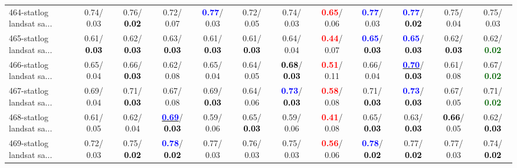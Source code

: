 \begin{table}[h]
\begin{center}
{\begin{tabular}{lc|c|c|c|c|c|c|c|c|c|c}
464-statlog landsat sa... &   0.74/  0.03 &   0.76/\textcolor{black}{\textbf{  0.02}} &   0.72/  0.07 & \textcolor{blue}{\textbf{  0.77}}/  0.03 &   0.72/  0.05 &   0.74/  0.03 & \textcolor{red}{\textbf{  0.65}}/  0.06 & \textcolor{blue}{\textbf{  0.77}}/  0.03 & \textcolor{blue}{\textbf{  0.77}}/\textcolor{black}{\textbf{  0.02}} &   0.75/  0.04 &   0.75/  0.03 \\
465-statlog landsat sa... &   0.61/\textcolor{black}{\textbf{  0.03}} &   0.62/\textcolor{black}{\textbf{  0.03}} &   0.63/\textcolor{black}{\textbf{  0.03}} &   0.61/\textcolor{black}{\textbf{  0.03}} &   0.61/\textcolor{black}{\textbf{  0.03}} &   0.64/  0.04 & \textcolor{red}{\textbf{  0.44}}/  0.07 & \textcolor{blue}{\textbf{  0.65}}/\textcolor{black}{\textbf{  0.03}} & \textcolor{blue}{\textbf{  0.65}}/\textcolor{black}{\textbf{  0.03}} &   0.62/\textcolor{black}{\textbf{  0.03}} &   0.62/\textcolor{darkgreen}{\textbf{  0.02}} \\
466-statlog landsat sa... &   0.65/  0.04 &   0.66/\textcolor{black}{\textbf{  0.03}} &   0.62/  0.08 &   0.65/  0.04 &   0.64/  0.05 & \textcolor{black}{\textbf{  0.68}}/\textcolor{black}{\textbf{  0.03}} & \textcolor{red}{\textbf{  0.51}}/  0.11 &   0.66/  0.04 & \underline{\textcolor{blue}{\textbf{  0.70}}}/\textcolor{black}{\textbf{  0.03}} &   0.61/  0.08 &   0.67/\textcolor{darkgreen}{\textbf{  0.02}} \\
467-statlog landsat sa... &   0.69/  0.04 &   0.71/\textcolor{black}{\textbf{  0.03}} &   0.67/  0.08 &   0.69/\textcolor{black}{\textbf{  0.03}} &   0.64/  0.06 & \textcolor{blue}{\textbf{  0.73}}/\textcolor{black}{\textbf{  0.03}} & \textcolor{red}{\textbf{  0.58}}/  0.08 &   0.71/\textcolor{black}{\textbf{  0.03}} & \textcolor{blue}{\textbf{  0.73}}/\textcolor{black}{\textbf{  0.03}} &   0.67/  0.05 &   0.71/\textcolor{darkgreen}{\textbf{  0.02}} \\
468-statlog landsat sa... &   0.61/  0.05 &   0.62/  0.04 & \underline{\textcolor{blue}{\textbf{  0.69}}}/\textcolor{black}{\textbf{  0.03}} &   0.59/  0.06 &   0.65/\textcolor{black}{\textbf{  0.03}} &   0.59/  0.06 & \textcolor{red}{\textbf{  0.41}}/  0.08 &   0.65/\textcolor{black}{\textbf{  0.03}} &   0.63/\textcolor{black}{\textbf{  0.03}} & \textcolor{black}{\textbf{  0.66}}/  0.05 &   0.62/\textcolor{black}{\textbf{  0.03}} \\
469-statlog landsat sa... &   0.72/  0.03 &   0.75/\textcolor{black}{\textbf{  0.02}} & \textcolor{blue}{\textbf{  0.78}}/\textcolor{black}{\textbf{  0.02}} &   0.77/  0.03 &   0.76/  0.03 &   0.75/  0.03 & \textcolor{red}{\textbf{  0.56}}/  0.06 & \textcolor{blue}{\textbf{  0.78}}/\textcolor{black}{\textbf{  0.02}} &   0.77/\textcolor{black}{\textbf{  0.02}} &   0.77/  0.03 &   0.74/\textcolor{black}{\textbf{  0.02}} \\ \hline

\end{tabular}}
\end{center}
\end{table}
